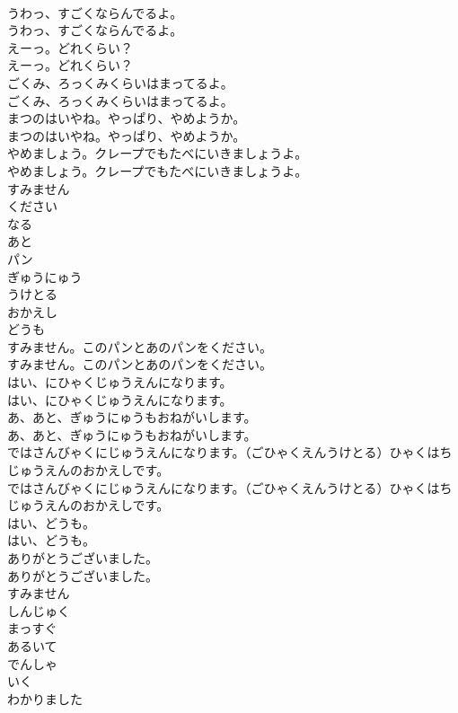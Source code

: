 \documentclass[8pt]{extreport}
\begin{document}
\begin{CJK}{UTF8}{min}
\\	うわっ、すごくならんでるよ。
\\	うわっ、すごくならんでるよ。
\\	えーっ。どれくらい？
\\	えーっ。どれくらい？
\\	ごくみ、ろっくみくらいはまってるよ。
\\	ごくみ、ろっくみくらいはまってるよ。
\\	まつのはいやね。やっぱり、やめようか。
\\	まつのはいやね。やっぱり、やめようか。
\\	やめましょう。クレープでもたべにいきましょうよ。
\\	やめましょう。クレープでもたべにいきましょうよ。
\\	すみません
\\	ください
\\	なる
\\	あと
\\	パン
\\	ぎゅうにゅう
\\	うけとる
\\	おかえし
\\	どうも
\\	すみません。このパンとあのパンをください。
\\	すみません。このパンとあのパンをください。
\\	はい、にひゃくじゅうえんになります。
\\	はい、にひゃくじゅうえんになります。
\\	あ、あと、ぎゅうにゅうもおねがいします。
\\	あ、あと、ぎゅうにゅうもおねがいします。
\\	ではさんびゃくにじゅうえんになります。（ごひゃくえんうけとる）ひゃくはちじゅうえんのおかえしです。
\\	ではさんびゃくにじゅうえんになります。（ごひゃくえんうけとる）ひゃくはちじゅうえんのおかえしです。
\\	はい、どうも。
\\	はい、どうも。
\\	ありがとうございました。
\\	ありがとうございました。
\\	すみません
\\	しんじゅく
\\	まっすぐ
\\	あるいて
\\	でんしゃ
\\	いく
\\	わかりました

\end{CJK}
\end{document}
